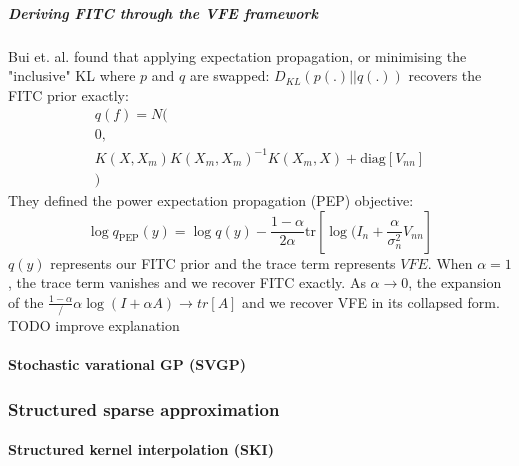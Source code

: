 \subparagraph{Deriving FITC through the VFE framework \cite{fitc-vfe-unifier}}
Bui et. al. found that applying expectation propagation, or minimising the "inclusive" KL where $p$ and $q$ are swapped: $D_{KL}(p(.) || q(.))$ recovers the FITC prior exactly:
\begin{equation*}
    \begin{aligned}
        q(f) = N ( \\
        0, \\
        K(X, X_m) K(X_m, X_m)^{-1} K(X_m, X) + \text{diag}[V_{nn}] \\
        )
    \end{aligned}
\end{equation*}
They defined the power expectation propagation (PEP) objective:
\begin{equation*}
    \log q_{\text{PEP}}(y) = \log q(y) - \frac{1 - \alpha}{2\alpha} \text{tr}\left[ \log(I_n + \frac{\alpha}{\sigma_n^2} V_{nn} \right]
\end{equation*}
$q(y)$ represents our FITC prior and the trace term represents $VFE$. When $\alpha = 1$, the trace term vanishes and we recover FITC exactly. As $\alpha \to 0$, the expansion of the $\frac{1-\alpha}/{\alpha} \log(I + \alpha A) \to tr[A]$ and we recover VFE in its collapsed form. \cite{fitc-vfe-unifier} TODO improve explanation


\paragraph{Stochastic varational GP (SVGP) \cite{svgp}}

\subsubsection{Structured sparse approximation}

\paragraph{Structured kernel interpolation (SKI) \cite{ski}}



% 
% 
% 


